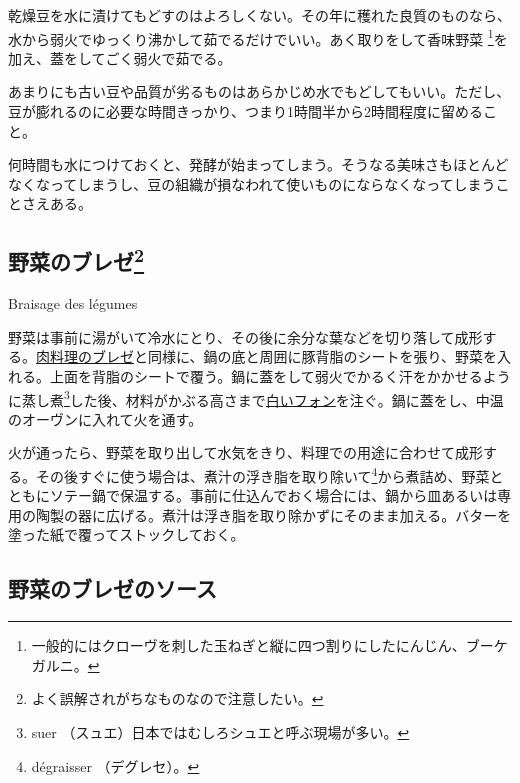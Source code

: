 \begin{main}
\begin{frsecbenv}
\end{frsecbenv}

乾燥豆を水に漬けてもどすのはよろしくない。その年に穫れた良質のものなら、水から弱火でゆっくり沸かして茹でるだけでいい。あく取りをして香味野菜
\footnote{一般的にはクローヴを刺した玉ねぎと縦に四つ割りにしたにんじん、ブーケガルニ。}を加え、蓋をしてごく弱火で茹でる。

あまりにも古い豆や品質が劣るものはあらかじめ水でもどしてもいい。ただし、豆が膨れるのに必要な時間きっかり、つまり1時間半から2時間程度に留めること。

何時間も水につけておくと、発酵が始まってしまう。そうなる美味さもほとんどなくなってしまうし、豆の組織が損なわれて使いものにならなくなってしまうことさえある。

\hypertarget{braisage-des-legumes}{%
\subsection[野菜のブレゼ]{\texorpdfstring{野菜のブレゼ\footnote{よく誤解されがちなものなので注意したい。}}{野菜のブレゼ}}\label{braisage-des-legumes}}

\begin{frsecbenv}

Braisage des légumes

\end{frsecbenv}

野菜は事前に湯がいて冷水にとり、その後に余分な葉などを切り落して成形する。\protect\hyperlink{braisage}{肉料理のブレゼ}と同様に、鍋の底と周囲に豚背脂のシートを張り、野菜を入れる。上面を背脂のシートで覆う。鍋に蓋をして弱火でかるく汗をかかせるように蒸し煮\footnote{suer
  （スュエ）日本ではむしろシュエと呼ぶ現場が多い。}した後、材料がかぶる高さまで\protect\hyperlink{fonds-blanc-ordinaire}{白いフォン}を注ぐ。鍋に蓋をし、中温のオーヴンに入れて火を通す。

火が通ったら、野菜を取り出して水気をきり、料理での用途に合わせて成形する。その後すぐに使う場合は、煮汁の浮き脂を取り除いて\footnote{dégraisser
  （デグレセ）。}から煮詰め、野菜とともにソテー鍋で保温する。事前に仕込んでおく場合には、鍋から皿あるいは専用の陶製の器に広げる。煮汁は浮き脂を取り除かずにそのまま加える。バターを塗った紙で覆ってストックしておく。

\hypertarget{sauce-des-legumes-braises}{%
\subsection{野菜のブレゼのソース}\label{sauce-des-legumes-braises}}


\end{main}
